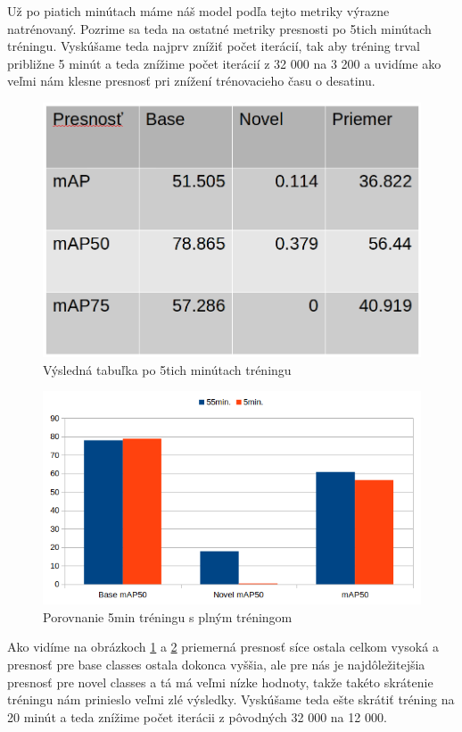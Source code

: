 Už po piatich minútach máme náš model podľa tejto metriky výrazne natrénovaný. Pozrime sa teda na ostatné metriky presnosti po 5tich minútach tréningu. Vyskúšame teda najprv znížiť počet iterácií, tak aby tréning trval približne 5 minút a teda znížime počet iterácií z 32 000 na 3 200 a uvidíme ako veľmi nám klesne presnosť pri znížení trénovacieho času o desatinu.

\begin{figure}[H]
\centering
\includegraphics[width=\textwidth]{images/table_1shot_5minutes.png}
\caption{Výsledná tabuľka po 5tich minútach tréningu}
\label{fig:image1}
\end{figure}

\begin{figure}[H]
\centering
\includegraphics[width=\textwidth]{images/chart_compare_5min.png}
\caption{Porovnanie 5min tréningu s plným tréningom}
\label{fig:image2}
\end{figure}

Ako vidíme na obrázkoch \ref{fig:image1} a \ref{fig:image2} priemerná presnosť síce ostala celkom vysoká a presnosť pre base classes ostala dokonca vyššia, ale pre nás je najdôležitejšia presnosť pre novel classes a tá má veľmi nízke hodnoty, takže takéto skrátenie tréningu nám prinieslo veľmi zlé výsledky. Vyskúšame teda ešte skrátiť tréning na 20 minút a teda znížime počet iterácii z pôvodných 32 000 na 12 000.

